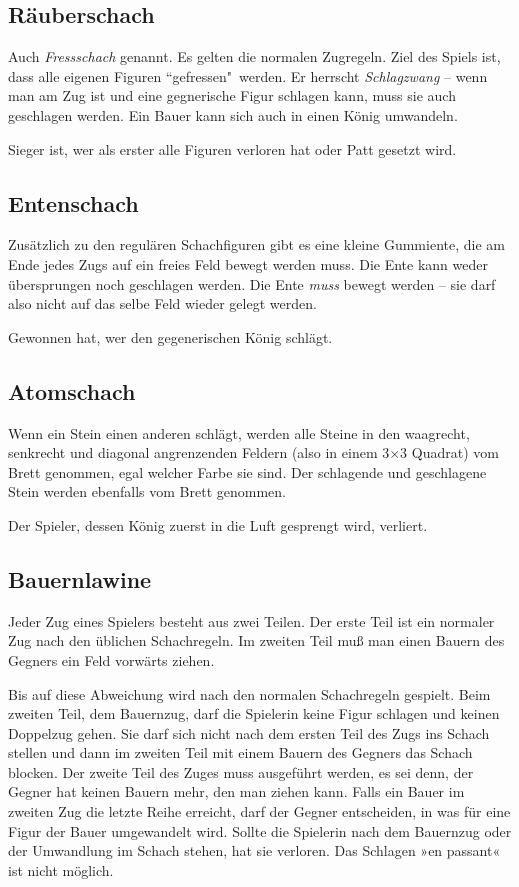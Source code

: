 \documentclass{article}
\begin{document}
\subsection{Räuberschach}
Auch \emph{Fressschach} genannt. Es gelten die normalen Zugregeln. Ziel des Spiels ist, dass alle eigenen Figuren ``gefressen"\  werden. Er herrscht \emph{Schlagzwang} -- wenn man am Zug ist und eine gegnerische Figur schlagen kann, muss sie auch geschlagen werden. Ein Bauer kann sich auch in einen König umwandeln.

Sieger ist, wer als erster alle Figuren verloren hat oder Patt gesetzt wird.

\subsection{Entenschach}
Zusätzlich zu den regulären Schachfiguren gibt es eine kleine Gummiente, die am Ende jedes Zugs auf ein freies Feld bewegt werden muss. Die Ente kann weder übersprungen noch geschlagen werden. Die Ente \emph{muss} bewegt werden --  sie darf also nicht auf das selbe Feld wieder gelegt werden.

Gewonnen hat, wer den gegenerischen König schlägt.

\subsection{Atomschach} 
Wenn ein Stein einen anderen schlägt, werden alle Steine in den waagrecht, senkrecht und diagonal angrenzenden Feldern (also in einem 3×3 Quadrat) vom Brett genommen, egal welcher Farbe sie sind. Der schlagende und geschlagene Stein werden ebenfalls vom Brett genommen.

Der Spieler, dessen König zuerst in die Luft gesprengt wird, verliert.


\subsection{Bauernlawine}
Jeder Zug eines Spielers besteht aus zwei Teilen. Der erste Teil ist ein normaler Zug nach den üblichen Schachregeln. Im zweiten Teil muß man einen Bauern des Gegners ein Feld vorwärts ziehen.

Bis auf diese Abweichung wird nach den normalen Schachregeln gespielt. Beim zweiten Teil, dem Bauernzug, darf die Spielerin keine Figur schlagen und keinen Doppelzug gehen. Sie darf sich nicht nach dem ersten Teil des Zugs ins Schach stellen und dann im zweiten Teil mit einem Bauern des Gegners das Schach blocken. Der zweite Teil des Zuges muss ausgeführt werden, es sei denn, der Gegner hat keinen Bauern mehr, den man ziehen kann. Falls ein Bauer im zweiten Zug die letzte Reihe erreicht, darf der Gegner entscheiden, in was für eine Figur der Bauer umgewandelt wird. Sollte die Spielerin nach dem Bauernzug oder der Umwandlung im Schach stehen, hat sie verloren. Das Schlagen »en passant« ist nicht möglich.
\end{document}
